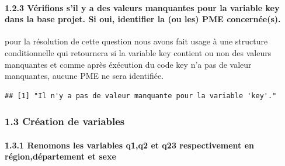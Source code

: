 \documentclass[
]{article}
\newenvironment{Shaded}{\begin{snugshade}}{\end{snugshade}}
\newcommand{\CommentTok}[1]{\textcolor[rgb]{0.56,0.35,0.01}{\textit{#1}}}
\newcommand{\ControlFlowTok}[1]{\textcolor[rgb]{0.13,0.29,0.53}{\textbf{#1}}}
\newcommand{\FunctionTok}[1]{\textcolor[rgb]{0.13,0.29,0.53}{\textbf{#1}}}
\newcommand{\NormalTok}[1]{#1}
\newcommand{\OtherTok}[1]{\textcolor[rgb]{0.56,0.35,0.01}{#1}}
\newcommand{\SpecialCharTok}[1]{\textcolor[rgb]{0.81,0.36,0.00}{\textbf{#1}}}
\newcommand{\StringTok}[1]{\textcolor[rgb]{0.31,0.60,0.02}{#1}}
\begin{document}
\hypertarget{vuxe9rifions-sil-y-a-des-valeurs-manquantes-pour-la-variable-key-dans-la-base-projet.-si-oui-identifier-la-ou-les-pme-concernuxe9es.}{%
\paragraph{1.2.3 Vérifions s'il y a des valeurs manquantes pour la
variable key dans la base projet. Si oui, identifier la (ou les) PME
concernée(s).}\label{vuxe9rifions-sil-y-a-des-valeurs-manquantes-pour-la-variable-key-dans-la-base-projet.-si-oui-identifier-la-ou-les-pme-concernuxe9es.}}

pour la résolution de cette question nous avons fait usage à une
structure conditionnelle qui retournera si la variable key contient ou
non des valeurs manquantes et comme après éxécution du code key n'a pas
de valeur manquantes, aucune PME ne sera identifiée.

\begin{Shaded}
\end{Shaded}

\begin{verbatim}
## [1] "Il n'y a pas de valeur manquante pour la variable 'key'."
\end{verbatim}

\hypertarget{cruxe9ation-de-variables}{%
\subsubsection{1.3 Création de
variables}\label{cruxe9ation-de-variables}}

\hypertarget{renomons-les-variables-q1q2-et-q23-respectivement-en-ruxe9gionduxe9partement-et-sexe}{%
\paragraph{1.3.1 Renomons les variables q1,q2 et q23 respectivement en
région,département et
sexe}\label{renomons-les-variables-q1q2-et-q23-respectivement-en-ruxe9gionduxe9partement-et-sexe}}
\end{document}

